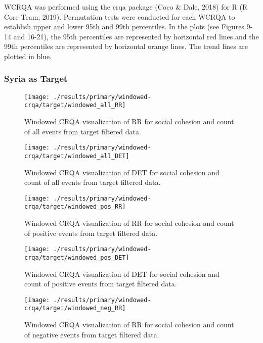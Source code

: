 \documentclass[english,man]{apa6}
\begin{document}
WCRQA was performed using the crqa package (Coco \& Dale, 2018) for R (R Core Team, 2019). Permutation tests were conducted for each WCRQA to establish upper and lower 95th and 99th percentiles. In the plots (see Figures 9-14 and 16-21), the 95th percentiles are represented by horizontal red lines and the 99th percentiles are represented by horizontal orange lines. The trend lines are plotted in blue.

\hypertarget{syria-as-target-1}{%
\subsubsection{Syria as Target}\label{syria-as-target-1}}

\begin{figure}
\texttt{[image: ./results/primary/windowed-crqa/target/windowed\_all\_RR]} \caption{Windowed CRQA visualization of RR for social cohesion and count of all events from target filtered data.}\label{fig:plot-RR-targ-all}
\end{figure}

\begin{figure}
\texttt{[image: ./results/primary/windowed-crqa/target/windowed\_all\_DET]} \caption{Windowed CRQA visualization of DET for social cohesion and count of all events from target filtered data.}\label{fig:plot-DET-targ-all}
\end{figure}

\begin{figure}
\texttt{[image: ./results/primary/windowed-crqa/target/windowed\_pos\_RR]} \caption{Windowed CRQA visualization of RR for social cohesion and count of positive events from target filtered data.}\label{fig:plot-RR-targ-pos}
\end{figure}

\begin{figure}
\texttt{[image: ./results/primary/windowed-crqa/target/windowed\_pos\_DET]} \caption{Windowed CRQA visualization of DET for social cohesion and count of positive events from target filtered data.}\label{fig:plot-DET-targ-pos}
\end{figure}

\begin{figure}
\texttt{[image: ./results/primary/windowed-crqa/target/windowed\_neg\_RR]} \caption{Windowed CRQA visualization of RR for social cohesion and count of negative events from target filtered data.}\label{fig:plot-RR-targ-neg}
\end{figure}
\end{document}
